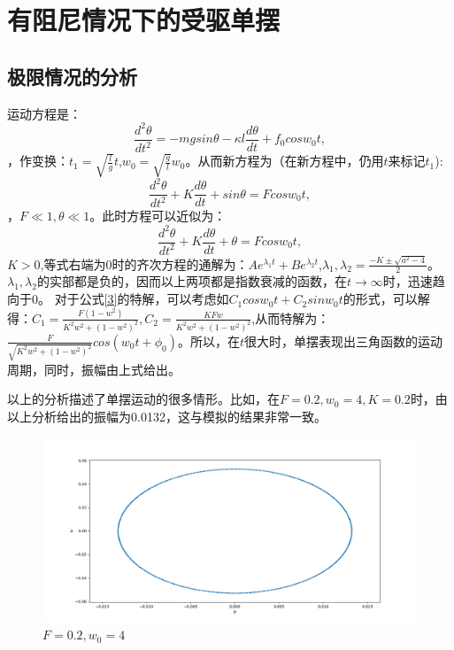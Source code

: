 \documentclass[UTF8]{ctexart}
\title{}
\author{李子龙\\201818000807036}
\begin{document}
\tableofcontents
\maketitle
\section{有阻尼情况下的受驱单摆}
\subsection{极限情况的分析}
运动方程是：
\begin{equation}
\label{1}
\frac{d^2\theta}{dt^2}=-mgsin\theta-\kappa l\frac{d\theta}{dt}+f_0cosw_0t,
\end{equation}
，作变换：$t_1=\sqrt{\frac{l}{g}}t$,$w_0=\sqrt{\frac{g}{l}}w_0$。从而新方程为（在新方程中，仍用$t$来标记$t_1$):
\begin{equation}
\label{2}
\frac{d^2\theta}{dt^2}+K\frac{d\theta}{dt}+sin\theta=Fcosw_0t,
\end{equation}
，$F\ll1,\theta\ll1$。此时方程可以近似为：
\begin{equation}
\label{3}
\frac{d^2\theta}{dt^2}+K\frac{d\theta}{dt}+\theta=Fcosw_0t,
\end{equation}
$K>0$,等式右端为0时的齐次方程的通解为：$Ae^{\lambda_1t}+Be^{\lambda_2t}$,$\lambda_1,\lambda_2=\frac{-K\pm\sqrt{a^2-4}}{2}$。$\lambda_1,\lambda_2$的实部都是负的，因而以上两项都是指数衰减的函数，在$t\rightarrow\infty$时，迅速趋向于0。
对于公式\ref{3}的特解，可以考虑如$C_1cosw_0t+C_2sinw_0t$的形式，可以解得：$C_1=\frac{F(1-w^2)}{K^2w^2+(1-w^2)^2},C_2=\frac{KFw}{K^2w^2+(1-w^2)^2}$,从而特解为：$\frac{F}{\sqrt{K^2w^2+(1-w^2)^2}}cos(w_0t+\phi_0)$。所以，在$t$很大时，单摆表现出三角函数的运动周期，同时，振幅由上式给出。\par
以上的分析描述了单摆运动的很多情形。比如，在$F=0.2,w_0=4,K=0.2$时，由以上分析给出的振幅为0.0132，这与模拟的结果非常一致。
\begin{figure}[H]
	\centering
	\includegraphics[width=0.7\linewidth]{F.png}
	\caption{$F=0.2,w_0=4$}
\end{figure}
\end{document}
